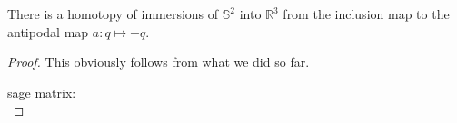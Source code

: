 %




\begin{theorem} 
    \leanok
    There is a homotopy of immersions of $𝕊^2$ into $ℝ^3$ from the inclusion map to
    the antipodal map $a : q ↦ -q$.
\end{theorem}
    

\begin{proof}
\leanok
This obviously follows from what we did so far.


sage matrix:
$$
$$
\end{proof}
